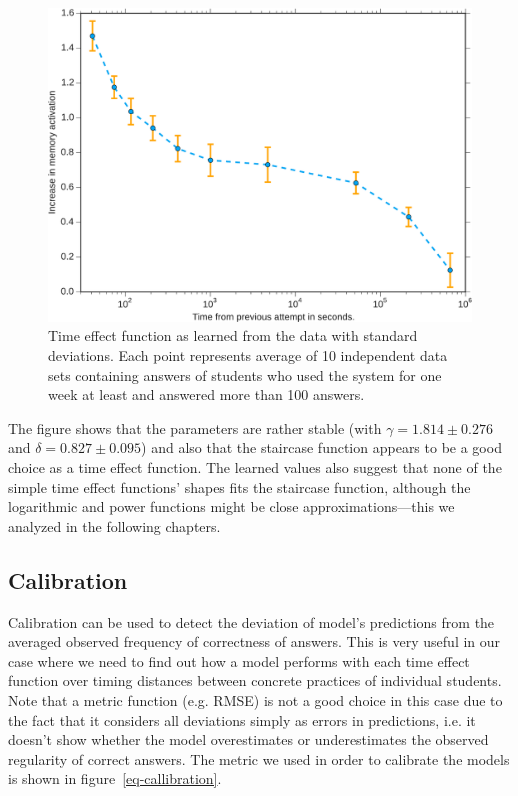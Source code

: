 \begin{figure}[htbp]
  \centering
  \includegraphics[width=\textwidth]{img/learned-time-effect-function}
  \caption{Time effect function as learned from the data with standard deviations. Each point represents average of 10 independent data sets containing answers of students who used the system for one week at least and answered more than 100 answers.}
  \label{fig:learned-time-effect-function}
\end{figure}

The figure shows that the parameters are rather stable (with $\gamma = 1.814 \pm 0.276$ and $\delta = 0.827 \pm 0.095$) and also that the staircase function appears to be a good choice as a time effect function. The learned values also suggest that none of the simple time effect functions' shapes fits the staircase function, although the logarithmic and power functions might be close approximations---this we analyzed in the following chapters.

\subsection{Calibration}
\label{memory-calibration}

Calibration can be used to detect the deviation of model's predictions from the averaged observed frequency of correctness of answers. This is very useful in our case where we need to find out how a model performs with each time effect function over timing distances between concrete practices of individual students. Note that a metric function (e.g. RMSE) is not a good choice in this case due to the fact that it considers all deviations simply as errors in predictions, i.e. it doesn't show whether the model overestimates or underestimates the observed regularity of correct answers. The metric we used in order to calibrate the models is shown in figure~\ref{eq-callibration}.

